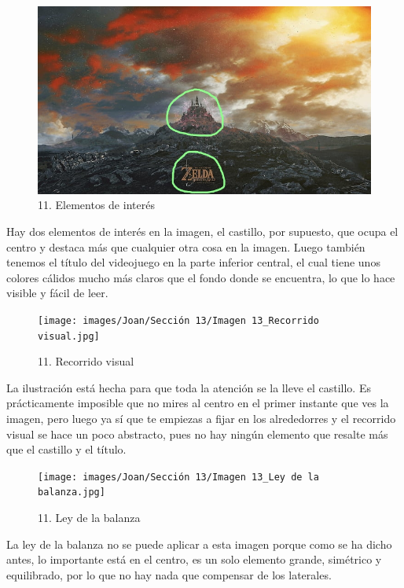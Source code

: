 \documentclass[12pt]{article}
\begin{document}
        \begin{figure}[H]
          \centering
          \includegraphics[scale=0.35]{images/Joan/Sección 13/Imagen 13_Elementos de interés.jpg}
          \caption{\small 11. Elementos de interés}
        \end{figure}
        Hay dos elementos de interés en la imagen, el castillo, por supuesto, que ocupa el centro y destaca más que cualquier otra cosa en la imagen. Luego también tenemos el título del videojuego en la parte inferior central, el cual tiene unos colores cálidos mucho más claros que el fondo donde se encuentra, lo que lo hace visible y fácil de leer. 

        \begin{figure}[H]
          \centering
          \texttt{[image: images/Joan/Sección 13/Imagen 13\_Recorrido visual.jpg]}
          \caption{\small 11. Recorrido visual}
        \end{figure}
        La ilustración está hecha para que toda la atención se la lleve el castillo. Es prácticamente imposible que no mires al centro en el primer instante que ves la imagen, pero luego ya sí que te empiezas a fijar en los alrededorres y el recorrido visual se hace un poco abstracto, pues no hay ningún elemento que resalte más que el castillo y el título. 

    \begin{figure}[H]
          \centering
          \texttt{[image: images/Joan/Sección 13/Imagen 13\_Ley de la balanza.jpg]}
          \caption{\small 11. Ley de la balanza}
        \end{figure}
        La ley de la balanza no se puede aplicar a esta imagen porque como se ha dicho antes, lo importante está en el centro, es un solo elemento grande, simétrico y equilibrado, por lo que no hay nada que compensar de los laterales. 
\end{document}
